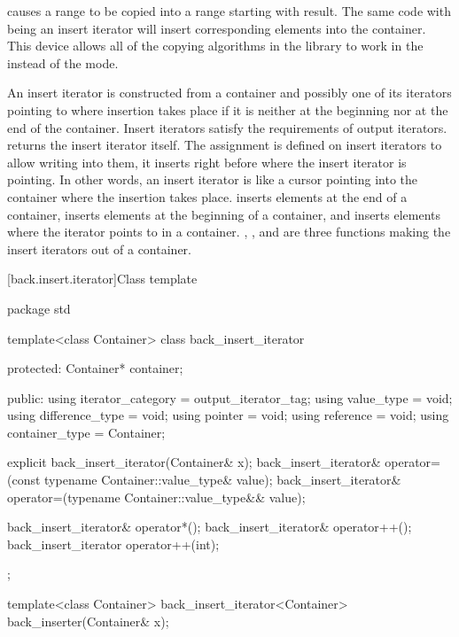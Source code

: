 causes a range 
to be copied into a range starting with result.
The same code with
being an insert iterator will insert corresponding elements into the container.
This device allows all of the
copying algorithms in the library to work in the
instead of the  mode.

\pnum
An insert iterator is constructed from a container and possibly one of its iterators pointing to where
insertion takes place if it is neither at the beginning nor at the end of the container.
Insert iterators satisfy the requirements of output iterators.
returns the insert iterator itself.
The assignment
is defined on insert iterators to allow writing into them, it inserts
right before where the insert iterator is pointing.
In other words, an insert iterator is like a cursor pointing into the
container where the insertion takes place.
inserts elements at the end of a container,
inserts elements at the beginning of a container, and
inserts elements where the iterator points to in a container.
,
,
and
are three
functions making the insert iterators out of a container.

[back.insert.iterator]{Class template }

%
\begin{codeblock}
package std {
  template<class Container>
  class back_insert_iterator {
  protected:
    Container* container;

  public:
    using iterator_category = output_iterator_tag;
    using value_type        = void;
    using difference_type   = void;
    using pointer           = void;
    using reference         = void;
    using container_type    = Container;

    explicit back_insert_iterator(Container& x);
    back_insert_iterator& operator=(const typename Container::value_type& value);
    back_insert_iterator& operator=(typename Container::value_type&& value);

    back_insert_iterator& operator*();
    back_insert_iterator& operator++();
    back_insert_iterator  operator++(int);
  };

  template<class Container>
    back_insert_iterator<Container> back_inserter(Container& x);
}
\end{codeblock}

